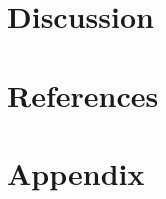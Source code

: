 \documentclass{sigchi}
\begin{document}
\section{Discussion}

\section{References}

\section{Appendix}


%
%
%
%
%
\balance



\end{document}
